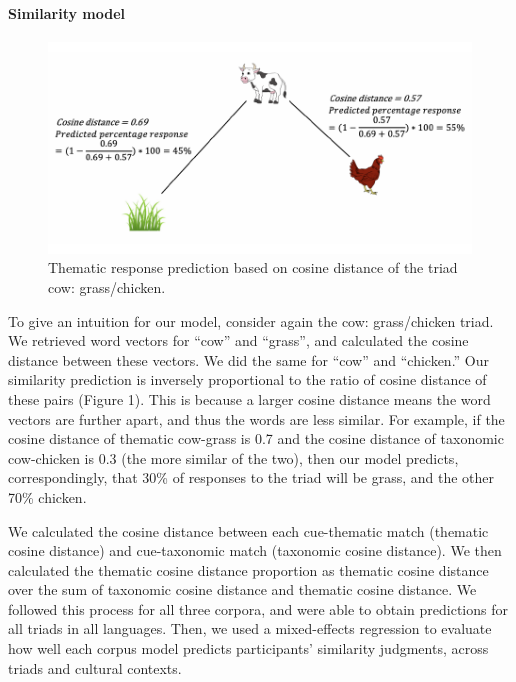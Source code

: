 \documentclass[10pt, letterpaper]{article}
\newenvironment{CodeChunk}{}{}
\begin{document}
\hypertarget{similarity-model}{%
\paragraph{Similarity model}\label{similarity-model}}

\begin{CodeChunk}
\begin{figure}[tb]

{\centering \includegraphics{figs/method-1} 

}

\caption[Thematic response prediction based on cosine distance of the triad cow]{Thematic response prediction based on cosine distance of the triad cow: grass/chicken.}\label{fig:method}
\end{figure}
\end{CodeChunk}

To give an intuition for our model, consider again the cow:
grass/chicken triad. We retrieved word vectors for ``cow'' and
``grass'', and calculated the cosine distance between these vectors. We
did the same for ``cow'' and ``chicken.'' Our similarity prediction is
inversely proportional to the ratio of cosine distance of these pairs
(Figure 1). This is because a larger cosine distance means the word
vectors are further apart, and thus the words are less similar. For
example, if the cosine distance of thematic cow-grass is 0.7 and the
cosine distance of taxonomic cow-chicken is 0.3 (the more similar of the
two), then our model predicts, correspondingly, that 30\% of responses
to the triad will be grass, and the other 70\% chicken.

We calculated the cosine distance between each cue-thematic match
(thematic cosine distance) and cue-taxonomic match (taxonomic cosine
distance). We then calculated the thematic cosine distance proportion as
thematic cosine distance over the sum of taxonomic cosine distance and
thematic cosine distance. We followed this process for all three
corpora, and were able to obtain predictions for all triads in all
languages. Then, we used a mixed-effects regression to evaluate how well
each corpus model predicts participants' similarity judgments, across
triads and cultural contexts.
\end{document}
